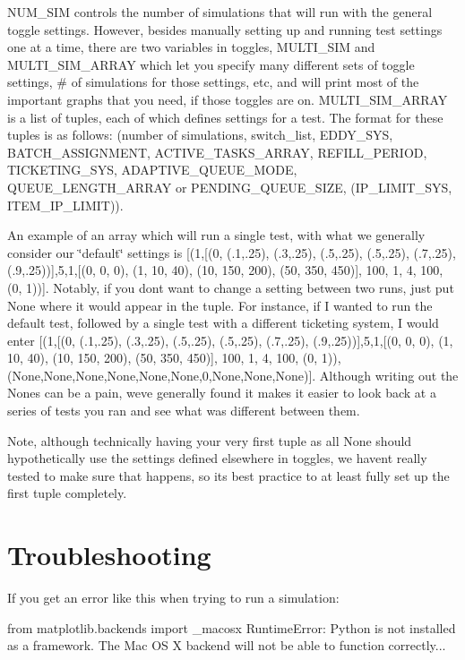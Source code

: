 N\+U\+M\+\_\+\+S\+IM controls the number of simulations that will run with the general toggle settings. However, besides manually setting up and running test settings one at a time, there are two variables in toggles, M\+U\+L\+T\+I\+\_\+\+S\+IM and M\+U\+L\+T\+I\+\_\+\+S\+I\+M\+\_\+\+A\+R\+R\+AY which let you specify many different sets of toggle settings, \# of simulations for those settings, etc, and will print most of the important graphs that you need, if those toggles are on. M\+U\+L\+T\+I\+\_\+\+S\+I\+M\+\_\+\+A\+R\+R\+AY is a list of tuples, each of which defines settings for a test. The format for these tuples is as follows\+: (number of simulations, switch\+\_\+list, E\+D\+D\+Y\+\_\+\+S\+YS, B\+A\+T\+C\+H\+\_\+\+A\+S\+S\+I\+G\+N\+M\+E\+NT, A\+C\+T\+I\+V\+E\+\_\+\+T\+A\+S\+K\+S\+\_\+\+A\+R\+R\+AY, R\+E\+F\+I\+L\+L\+\_\+\+P\+E\+R\+I\+OD, T\+I\+C\+K\+E\+T\+I\+N\+G\+\_\+\+S\+YS, A\+D\+A\+P\+T\+I\+V\+E\+\_\+\+Q\+U\+E\+U\+E\+\_\+\+M\+O\+DE, Q\+U\+E\+U\+E\+\_\+\+L\+E\+N\+G\+T\+H\+\_\+\+A\+R\+R\+AY or P\+E\+N\+D\+I\+N\+G\+\_\+\+Q\+U\+E\+U\+E\+\_\+\+S\+I\+ZE, (I\+P\+\_\+\+L\+I\+M\+I\+T\+\_\+\+S\+YS, I\+T\+E\+M\+\_\+\+I\+P\+\_\+\+L\+I\+M\+IT)).

An example of an array which will run a single test, with what we generally consider our \char`\"{}default\char`\"{} settings is \mbox{[}(1,\mbox{[}(0, (.1,.25), (.3,.25), (.5,.25), (.5,.25), (.7,.25), (.9,.25))\mbox{]},5,1,\mbox{[}(0, 0, 0), (1, 10, 40), (10, 150, 200), (50, 350, 450)\mbox{]}, 100, 1, 4, 100, (0, 1))\mbox{]}. Notably, if you don\textquotesingle{}t want to change a setting between two runs, just put None where it would appear in the tuple. For instance, if I wanted to run the default test, followed by a single test with a different ticketing system, I would enter \mbox{[}(1,\mbox{[}(0, (.1,.25), (.3,.25), (.5,.25), (.5,.25), (.7,.25), (.9,.25))\mbox{]},5,1,\mbox{[}(0, 0, 0), (1, 10, 40), (10, 150, 200), (50, 350, 450)\mbox{]}, 100, 1, 4, 100, (0, 1)),(None,None,None,None,None,None,0,None,None,None)\mbox{]}. Although writing out the Nones can be a pain, we\textquotesingle{}ve generally found it makes it easier to look back at a series of tests you ran and see what was different between them.

Note, although technically having your very first tuple as all None should hypothetically use the settings defined elsewhere in toggles, we haven\textquotesingle{}t really tested to make sure that happens, so it\textquotesingle{}s best practice to at least fully set up the first tuple completely.\hypertarget{install_info_trouble}{}\section{Troubleshooting}\label{install_info_trouble}
If you get an error like this when trying to run a simulation\+: \begin{DoxyVerb}    from matplotlib.backends import _macosx
RuntimeError: Python is not installed as a framework. The Mac OS X backend will not be able to function correctly...
\end{DoxyVerb}



